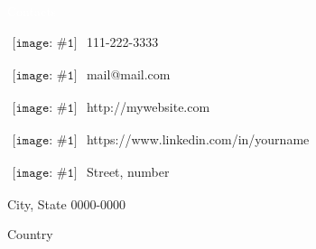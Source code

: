 
\newcommand{\ContactEntry}[2]{
	$\begin{array}{l}
	{\texttt{[image: \#1]}}
	\end{array}
	$ #2
}


\LARGE
\noindent\colorbox{materialGreen}
{\parbox[c][25pt][c]{\textwidth}{\hspace{15pt}\textcolor{white}{Contacts}}} %

\begin{multicols}{2}

\large
\ContactEntry{images/green/telephone1}{111-222-3333}

\ContactEntry{images/green/mail9}{mail@mail.com}

\ContactEntry{images/green/links1}{http://mywebsite.com}

\ContactEntry{images/green/linkedin2}{https://www.linkedin.com/in/yourname}

\columnbreak

\ContactEntry{images/green/house3}{Street, number

\hspace*{25pt} City, State 0000-0000

\hspace*{25pt} Country}


\end{multicols}
